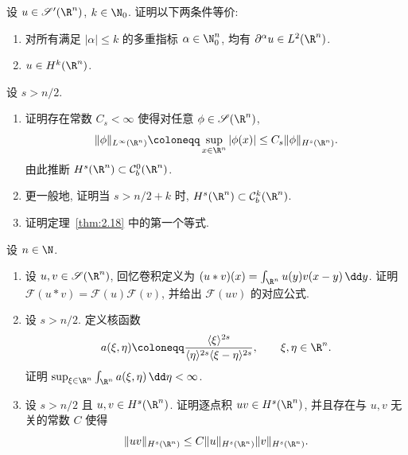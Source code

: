 \begin{exer}\label{ex:2.7}
设 $u \in \TempDistr(\R^n)$, $k \in \N_0$. 证明以下两条件等价:
\begin{enumerate}
    \item 对所有满足 $|\alpha| \le k$ 的多重指标 $\alpha \in \N_0^n$, 均有 $\partial^\alpha u \in L^2(\R^n)$.
    \item $u \in H^k(\R^n)$.
\end{enumerate}
\end{exer}

\begin{exer}\label{ex:2.8}
设 $s > n/2$.
\begin{enumerate}
    \item 证明存在常数 $C_s < \infty$ 使得对任意 $\phi \in \Schwartz(\R^n)$,
    \begin{equation}\label{eq:2.73}
        \|\phi\|_{L^\infty(\R^n)} \defeq \sup_{x \in \R^n} |\phi(x)| \le C_s \|\phi\|_{H^s(\R^n)}.
    \end{equation}
    由此推断 $H^s(\R^n) \subset \mathcal{C}_b^0(\R^n)$.
    \item 更一般地, 证明当 $s > n/2 + k$ 时, $H^s(\R^n) \subset \mathcal{C}_b^k(\R^n)$.
    \item 证明定理~\ref{thm:2.18} 中的第一个等式.
\end{enumerate}
\end{exer}

\begin{exer}\label{ex:2.9}
设 $n \in \N$.
\begin{enumerate}
    \item 设 $u, v \in \Schwartz(\R^n)$, 回忆卷积定义为 $(u * v)(x) = \int_{\R^n} u(y) v(x - y) \,\dd y$. 证明 $\mathcal{F}(u * v) = \mathcal{F}(u) \mathcal{F}(v)$, 并给出 $\mathcal{F}(u v)$ 的对应公式.
    \item 设 $s > n/2$. 定义核函数
    \begin{equation}\label{eq:2.74}
        a(\xi, \eta) \defeq \frac{\langle \xi \rangle^{2s}}{\langle \eta \rangle^{2s} \langle \xi - \eta \rangle^{2s}}, \qquad \xi, \eta \in \R^n.
    \end{equation}
    证明 $\sup_{\xi \in \R^n} \int_{\R^n} a(\xi, \eta) \,\dd\eta < \infty$.
    \item 设 $s > n/2$ 且 $u, v \in H^s(\R^n)$. 证明逐点积 $u v \in H^s(\R^n)$, 并且存在与 $u, v$ 无关的常数 $C$ 使得
    \[
        \|u v\|_{H^s(\R^n)} \le C \|u\|_{H^s(\R^n)} \|v\|_{H^s(\R^n)}.
    \]
\end{enumerate}
\end{exer}

